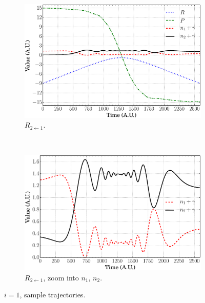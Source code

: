 \documentclass[xetex,mathserif,serif]{beamer}
\newcommand{\rto}{$ R_{2\leftarrow1} $}
\begin{document}
\begin{frame}
{\begin{figure}
\begin{subfigure}[t]{0.45\textwidth}
\includegraphics[width=\textwidth]{ec_traj_r21.eps}
\vspace{-0.1cm}
\caption{{\fontsize{7}{8}\selectfont \rto.}}
\end{subfigure}
~
\begin{subfigure}[t]{0.45\textwidth}
\centering
\includegraphics[width=\textwidth]{ec_traj_r21_e.eps}
\vspace{-0.1cm}
\caption{{\fontsize{7}{8}\selectfont \rto, zoom into $ n_{1}$, $n_{2} $.}}
\end{subfigure}
\vspace{-0.1cm}
\caption{$ i = 1 $, sample trajectories.}
\end{figure}
}{}


\end{frame}
\end{document}
